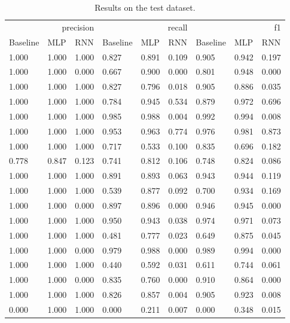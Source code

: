 \begin{table}
\caption{Results on the test dataset.}
\label{tab::ex_2_test}
\begin{tabular}{|l||l||l||l||l||l||l||l||l|}
\toprule
\multicolumn{3}{r}{precision} & \multicolumn{3}{r}{recall} & \multicolumn{3}{r}{f1} \\
Baseline & MLP & RNN & Baseline & MLP & RNN & Baseline & MLP & RNN \\
\midrule
1.000 & 1.000 & 1.000 & 0.827 & 0.891 & 0.109 & 0.905 & 0.942 & 0.197 \\
1.000 & 1.000 & 0.000 & 0.667 & 0.900 & 0.000 & 0.801 & 0.948 & 0.000 \\
1.000 & 1.000 & 1.000 & 0.827 & 0.796 & 0.018 & 0.905 & 0.886 & 0.035 \\
1.000 & 1.000 & 1.000 & 0.784 & 0.945 & 0.534 & 0.879 & 0.972 & 0.696 \\
1.000 & 1.000 & 1.000 & 0.985 & 0.988 & 0.004 & 0.992 & 0.994 & 0.008 \\
1.000 & 1.000 & 1.000 & 0.953 & 0.963 & 0.774 & 0.976 & 0.981 & 0.873 \\
1.000 & 1.000 & 1.000 & 0.717 & 0.533 & 0.100 & 0.835 & 0.696 & 0.182 \\
0.778 & 0.847 & 0.123 & 0.741 & 0.812 & 0.106 & 0.748 & 0.824 & 0.086 \\
1.000 & 1.000 & 1.000 & 0.891 & 0.893 & 0.063 & 0.943 & 0.944 & 0.119 \\
1.000 & 1.000 & 1.000 & 0.539 & 0.877 & 0.092 & 0.700 & 0.934 & 0.169 \\
1.000 & 1.000 & 0.000 & 0.897 & 0.896 & 0.000 & 0.946 & 0.945 & 0.000 \\
1.000 & 1.000 & 1.000 & 0.950 & 0.943 & 0.038 & 0.974 & 0.971 & 0.073 \\
1.000 & 1.000 & 1.000 & 0.481 & 0.777 & 0.023 & 0.649 & 0.875 & 0.045 \\
1.000 & 1.000 & 0.000 & 0.979 & 0.988 & 0.000 & 0.989 & 0.994 & 0.000 \\
1.000 & 1.000 & 1.000 & 0.440 & 0.592 & 0.031 & 0.611 & 0.744 & 0.061 \\
1.000 & 1.000 & 0.000 & 0.835 & 0.760 & 0.000 & 0.910 & 0.864 & 0.000 \\
1.000 & 1.000 & 1.000 & 0.826 & 0.857 & 0.004 & 0.905 & 0.923 & 0.008 \\
0.000 & 1.000 & 1.000 & 0.000 & 0.211 & 0.007 & 0.000 & 0.348 & 0.015 \\
\bottomrule
\end{tabular}
\end{table}
